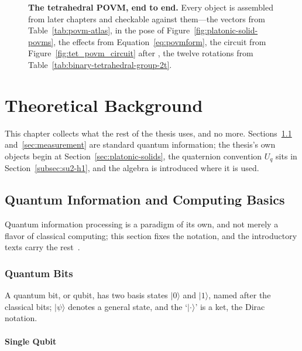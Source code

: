 \documentclass[11pt, oneside, openany]{scrbook}
\newcommand{\ket}[1]{|#1\rangle}
\begin{document}
\begin{figure}[p]
  
  \caption{\textbf{The tetrahedral POVM, end to end.} Every object is assembled from later chapters and checkable against them---the vectors from Table~\ref{tab:povm-atlas}, in the pose of Figure~\ref{fig:platonic-solid-povms}, the effects from Equation~\eqref{eq:povmform}, the circuit from Figure~\ref{fig:tet_povm_circuit} after \textcite{decker2004quantumcircuitssinglequbit}, the twelve rotations from Table~\ref{tab:binary-tetrahedral-group-2t}.}
  \label{fig:tetrahedron-recipe}
\end{figure}
\clearpage

\chapter{Theoretical Background} \label{cha:theoreticalbackground}

This chapter collects what the rest of the thesis uses, and no more. Sections~\ref{sec:quantuminfobasics} and~\ref{sec:measurement} are standard quantum information; the thesis's own objects begin at Section~\ref{sec:platonic-solids}, the quaternion convention $U_q$ sits in Section~\ref{subsec:su2-h1}, and the algebra is introduced where it is used.

\section{Quantum Information and Computing Basics} \label{sec:quantuminfobasics}

Quantum information processing is a paradigm of its own, and not merely a flavor of classical computing; this section fixes the notation, and the introductory texts carry the rest~\cite{nielsen2010quantumcomputationquantum,watrous2025understandingquantuminformation,watrous2018theoryquantuminformation}.

\subsection{Quantum Bits}

A quantum bit, or qubit, has two basis states $\ket{0}$ and $\ket{1}$, named after the classical bits; $\ket{\psi}$ denotes a general state, and the `$\ket{\cdot}$' is a ket, the Dirac notation.

\subsubsection{Single Qubit}
\end{document}
